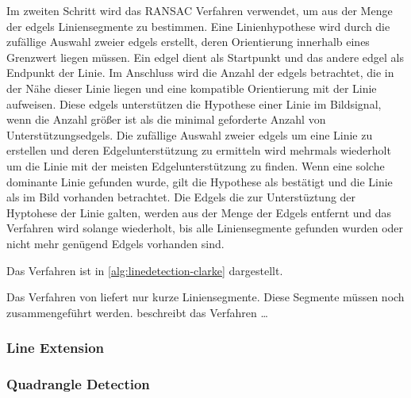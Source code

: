 Im zweiten Schritt wird das RANSAC Verfahren verwendet, um aus der Menge der \gls{edgels} Liniensegmente zu bestimmen.
 Eine Linienhypothese wird durch die zufällige Auswahl zweier \gls{edgels} erstellt, deren Orientierung innerhalb eines
 Grenzwert liegen müssen. Ein edgel dient als Startpunkt und das andere edgel als Endpunkt der Linie. Im Anschluss wird
 die Anzahl der \gls{edgels} betrachtet, die in der Nähe dieser Linie liegen und eine kompatible Orientierung mit der
 Linie aufweisen. Diese \gls{edgels} unterstützen die Hypothese einer Linie im Bildsignal, wenn die Anzahl größer ist
 als die minimal geforderte Anzahl von Unterstützungsedgels. Die zufällige Auswahl zweier \gls{edgels} um eine Linie zu
 erstellen und deren Edgelunterstützung zu ermitteln wird mehrmals wiederholt um die Linie mit der meisten
 Edgelunterstützung zu finden. Wenn eine solche dominante Linie gefunden wurde, gilt die Hypothese als bestätigt und
 die Linie als im Bild vorhanden betrachtet. Die Edgels die zur Unterstüztung der Hyptohese der Linie galten, werden
 aus der Menge der Edgels entfernt und das Verfahren wird solange wiederholt, bis alle Liniensegmente gefunden wurden
 oder nicht mehr genügend Edgels vorhanden sind.

Das Verfahren ist in \autoref{alg:linedetection-clarke} dargestellt.



Das Verfahren von \citeauthor{clarke96} liefert nur kurze Liniensegmente. Diese Segmente müssen noch zusammengeführt werden. \citeauthor{hirzer08} beschreibt das Verfahren \dots

\subsubsection{Line Extension} %
\label{sub:line_extension}

\subsubsection{Quadrangle Detection} %
\label{sub:quadrangle_detection}

